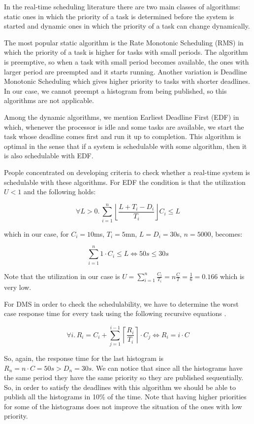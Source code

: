 In the real-time scheduling literature there are two main classes of algorithms: static ones in which the priority of a task is determined before the system is started and dynamic ones in which the priority of a task can change dynamically. 

The most popular static algorithm is the Rate Monotonic Scheduling (RMS) \citep{liu1973scheduling} in which the priority of a task is higher for tasks with small periods. The algorithm is preemptive, so when a task with small period becomes available, the ones with larger period are preempted and it starts running. Another variation is Deadline Monotonic Scheduling which gives higher priority to tasks with shorter deadlines. In our case, we cannot preempt a histogram from being published, so this algorithms are not applicable. 

Among the dynamic algorithms, we mention Earliest Deadline First (EDF) \citep{liu1973scheduling} in which, whenever the processor is idle and some tasks are available, we start the task whose deadline comes first and run it up to completion. This algorithm is optimal in the sense that if a system is schedulable with some algorithm, then it is also schedulable with EDF.

People concentrated on developing criteria to check whether a real-time system is schedulable with these algorithms. For EDF the condition \citep{baruah1990algorithms} is that the utilization $U < 1$ and the following holds:

$$ \forall L > 0.\,  \sum_{i=1}^n \left\lfloor \frac{L+T_i-D_i}{T_i}\right\rfloor C_i \le L $$

which in our case, for $C_i=10$ms, $T_i=5$mn, $L=D_i=30$s, $n=5000$, becomes:

$$ \sum_{i=1}^n 1 \cdot C_i \le L \Leftrightarrow 50s \le 30s $$

Note that the utilization in our case is $U=\sum_{i=1}^n\frac{C_i}{T_i}=n\frac C T = \frac 1 6 = 0.166$ which is very low. 

For DMS in order to check the schedulability, we have to determine the worst case response time for every task using the following recursive equations \citep{joseph1986finding}.

 $$ \forall i.\, R_i=C_i+\sum_{j=1}^{i-1} \left\lceil \frac{R_i}{T_i} \right\rceil \cdot C_j \Leftrightarrow R_i = i\cdot C$$
 
 So, again, the response time for the last histogram is $R_n=n\cdot C=50s >D_n=30s$. We can notice that since all the histograms have the same period they have the same priority so they are published sequentially. So, in order to satisfy the deadlines with this algorithm we should be able to publish all the histograms in 10\% of the time. Note that having higher priorities for some of the histograms does not improve the situation of the ones with low priority.

